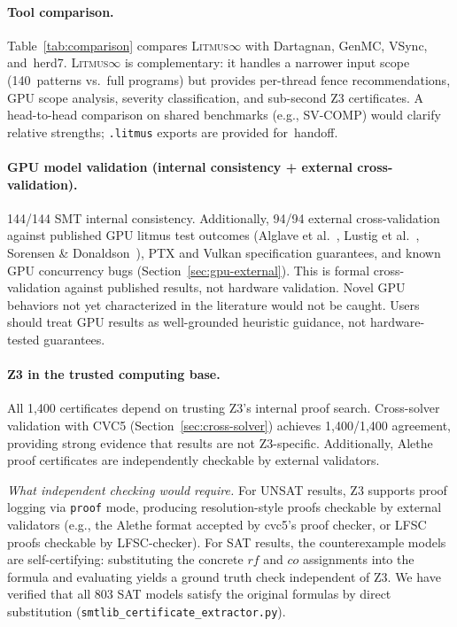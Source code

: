 \documentclass[11pt]{article}
\newcommand{\litmus}{\textsc{Litmus$\infty$}}
\begin{document}
\paragraph{Tool comparison.}
Table~\ref{tab:comparison} compares \litmus{} with
Dartagnan, GenMC, VSync, and~herd7.
\litmus{} is complementary: it handles a narrower input scope
(140~patterns vs.\ full programs) but provides per-thread fence
recommendations, GPU scope analysis, severity classification,
and sub-second Z3 certificates.
A head-to-head comparison on shared benchmarks
(e.g., SV-COMP) would clarify relative strengths;
\texttt{.litmus} exports are provided for~handoff.

\paragraph{GPU model validation (internal consistency + external cross-validation).}
144/144 SMT internal consistency. Additionally, 94/94 external
cross-validation against published GPU litmus test outcomes
(Alglave et al.~\cite{Alglave2015GPU}, Lustig et al.~\cite{Lustig2019},
Sorensen \& Donaldson~\cite{Sorensen2016}), PTX and Vulkan specification
guarantees, and known GPU concurrency bugs
(Section~\ref{sec:gpu-external}).
This is formal cross-validation against published results, not
hardware validation. Novel GPU behaviors not yet characterized
in the literature would not be caught. Users should treat GPU
results as well-grounded heuristic guidance, not hardware-tested
guarantees.

\paragraph{Z3 in the trusted computing base.}
All 1{,}400 certificates depend on trusting Z3's internal proof search.
Cross-solver validation with CVC5 (Section~\ref{sec:cross-solver})
achieves 1{,}400/1{,}400 agreement, providing strong evidence that
results are not Z3-specific.  Additionally, Alethe proof certificates
are independently checkable by external validators.

\emph{What independent checking would require.}
For UNSAT results, Z3 supports proof logging via \texttt{proof} mode,
producing resolution-style proofs checkable by external validators
(e.g., the Alethe format accepted by cvc5's proof checker, or
LFSC proofs checkable by LFSC-checker).
For SAT results, the counterexample models are self-certifying:
substituting the concrete $\mathit{rf}$ and $\mathit{co}$
assignments into the formula and evaluating yields a ground truth
check independent of Z3.
We have verified that all 803 SAT models satisfy the original
formulas by direct substitution
(\texttt{smtlib\_certificate\_\allowbreak{}extractor.py}).
\end{document}
